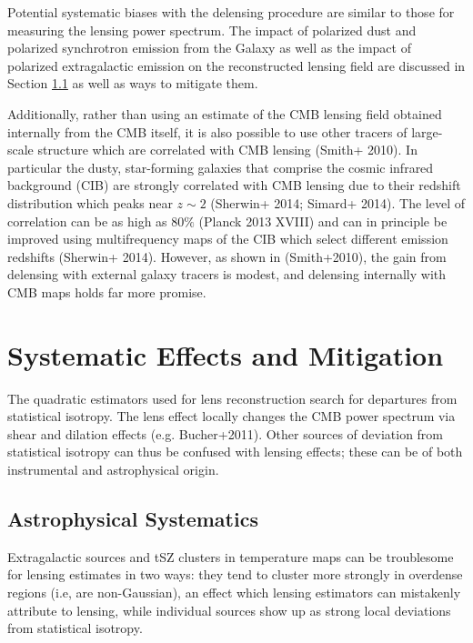 Potential systematic biases with the delensing procedure are similar to those for measuring the lensing power spectrum. The impact of polarized dust and polarized synchrotron emission from the Galaxy as well as the impact of polarized extragalactic emission on the reconstructed lensing field are discussed in Section \ref{systAst} as well as ways to mitigate them.

Additionally, rather than using an estimate of the CMB lensing field obtained internally from the CMB itself, it is also possible to use other tracers of large-scale structure which are correlated with  CMB lensing (Smith+ 2010).  In particular the dusty, star-forming galaxies that comprise the cosmic infrared background (CIB) are strongly correlated with CMB lensing due to their redshift distribution which peaks near $z \sim 2$ (Sherwin+ 2014; Simard+ 2014).  The level of correlation can be as high as $80\%$ (Planck 2013 XVIII) and can in principle be improved using multifrequency maps of the CIB which select different emission redshifts (Sherwin+ 2014). However, as shown in (Smith+2010), the gain from delensing with external galaxy tracers is modest, and delensing internally with CMB maps holds far more promise.


\section{Systematic Effects and Mitigation}\label{syst}
The quadratic estimators used for lens reconstruction search for departures from statistical isotropy.  The lens effect locally changes the CMB power spectrum via shear and dilation effects (e.g. Bucher+2011).  Other sources of 
deviation from statistical isotropy can thus be confused with lensing effects; these can be of both instrumental and astrophysical origin.

\subsection{Astrophysical Systematics}\label{systAst}
	
Extragalactic sources and tSZ clusters in temperature maps can be troublesome for 
lensing estimates in two ways: they tend to cluster more
strongly in overdense regions (i.e, are non-Gaussian), an effect which
lensing estimators can mistakenly attribute to lensing, while individual
sources show up as strong local deviations from statistical isotropy.  

